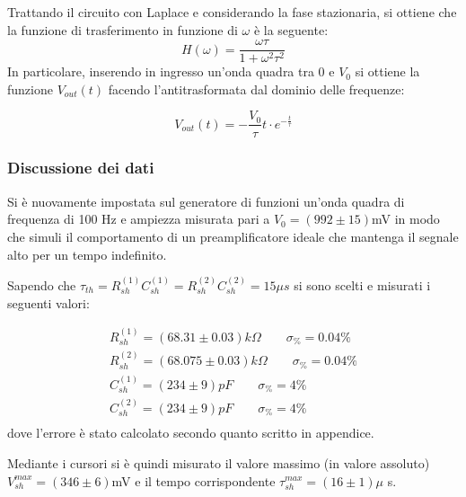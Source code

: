 \documentclass{article}
\begin{document}
Trattando il circuito con Laplace e considerando la fase stazionaria, si ottiene che la funzione di trasferimento in funzione di 
$\omega$ è la seguente:
\begin{equation}
H(\omega)=\frac{\omega \tau}{1+\omega^2\tau^2}
\end{equation}
In particolare, inserendo in ingresso un'onda quadra tra 0 e $V_0$ si ottiene la funzione $V_{out}(t)$ facendo l'antitrasformata 
dal dominio delle frequenze:

\begin{equation}
    \label{eqn:V_sh}
    V_{out}(t)= - \frac{V_0}{\tau} t \cdot e^{-\frac{t}{\tau}}
\end{equation}
    

\subsubsection{Discussione dei dati}
Si è nuovamente impostata sul generatore di funzioni un'onda quadra di frequenza di 100 Hz e ampiezza misurata pari a $V_{0}=(992 \pm 15)$mV
in modo che simuli il comportamento di un preamplificatore ideale che mantenga il segnale alto per un tempo indefinito.

Sapendo che $\tau_{th}=R_{sh}^{(1)} C_{sh}^{(1)} = R_{sh}^{(2)} C_{sh}^{(2)}=15 \mu s$ si sono scelti e misurati i seguenti valori:

\begin{align*}
R_{sh}^{(1)} = (68.31  \pm 0.03)k\Omega \quad\quad \sigma_{\%}=  0.04 \% \\
R_{sh}^{(2)} = (68.075  \pm 0.03)k\Omega \quad\quad \sigma_{\%}=  0.04\% \\
C_{sh}^{(1)}= (234 \pm  9)pF \quad\quad \sigma_{\%}= 4 \% \\
C_{sh}^{(2)}= (234 \pm  9)pF \quad\quad \sigma_{\%}= 4 \% \\
\end{align*}
dove l'errore è stato calcolato secondo quanto scritto in appendice. %

Mediante i cursori si è quindi misurato il valore massimo (in valore assoluto) $V_{sh}^{max}=(346 \pm 6)$mV e il tempo corrispondente 
$\tau_{sh}^{max}=(16 \pm 1)\mu$ s.
\end{document}
